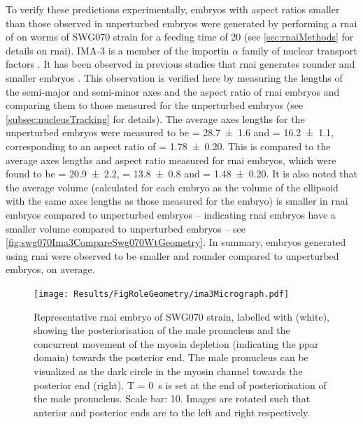 To verify these predictions experimentally, embryos with aspect ratios smaller than those observed in unperturbed embryos were generated by performing a \ac{rnai} of  on worms of SWG070 strain for a feeding time of \SI{20}{\unitRNAiTime} (see \autoref{sec:rnaiMethods} for details on \ac{rnai}). IMA-3 is a member of the importin $\alpha$ family of nuclear transport factors \citep{geles2001germline,sonnichsen2005full}. It has been observed in previous studies that  \ac{rnai} generates rounder and smaller embryos \citep{sonnichsen2005full}. This observation is verified here by measuring the lengths of the semi-major \longAxisLength and semi-minor \shortAxisLength axes and the aspect ratio of  \ac{rnai} embryos and comparing them to those measured for the unperturbed embryos (see \autoref{subsec:nucleusTracking} for details). The average axes lengths for the unperturbed embryos were measured to be \longAxisLength = \SI{28.7 +- 1.6}{\unitLength} and \shortAxisLength = \SI{16.2 +- 1.1}{\unitLength}, corresponding to an aspect ratio of \aspectRatio = \num{1.78 +- 0.20}. This is compared to the average axes lengths and aspect ratio measured for  \ac{rnai} embryos, which were found to be \longAxisLength = \SI{20.9 +- 2.2}{\unitLength}, \shortAxisLength = \SI{13.8 +- 0.8}{\unitLength} and \aspectRatio = \num{1.48 +- 0.20}. It is also noted that the average volume (calculated for each embryo as the volume of the ellipsoid with the same axes lengths as those measured for the embryo) is smaller in  \ac{rnai} embryos compared to unperturbed embryos -- indicating  \ac{rnai} embryos have a smaller volume compared to unperturbed embryos -- see \autoref{fig:swg070Ima3CompareSwg070WtGeometry}. In summary, embryos generated using  \ac{rnai} were observed to be smaller and rounder compared to unperturbed embryos, on average.

\begin{figure}
\centering
\texttt{[image: Results/FigRoleGeometry/ima3Micrograph.pdf]}
\caption[Representative micrograph:  \acs{rnai} embryos]{Representative  \acs{rnai} embryo of SWG070 strain, labelled with  (white), showing the posteriorisation of the male pronucleus and the concurrent movement of the myosin depletion (indicating the \ac{ppar} domain) towards the posterior end. The male pronucleus can be visualized as the dark circle in the myosin channel towards the posterior end (right). T = \SI{0}{\second} is set at the end of posteriorisation of the male pronucleus. Scale bar: \SI{10}{\unitLength}. Images are rotated such that anterior and posterior ends are to the left and right respectively.}
\label{fig:swg070Ima3Micrograph}
\end{figure}

